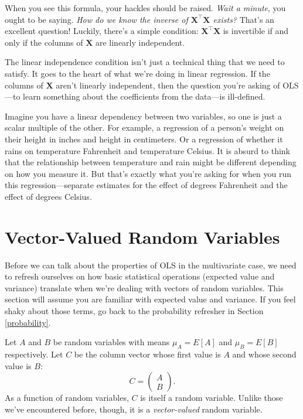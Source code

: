 \documentclass[12pt,oneside,openany]{book}
\begin{document}
When you see this formula, your hackles should be raised. \emph{Wait a
minute}, you ought to be saying. \emph{How do we know the inverse of
\(\mathbf{X}^\top \mathbf{X}\) exists?} That's an excellent question!
Luckily, there's a simple condition: \(\mathbf{X}^\top \mathbf{X}\) is
invertible if and only if the columns of \(\mathbf{X}\) are linearly
independent.

The linear independence condition isn't just a technical thing that we
need to satisfy. It goes to the heart of what we're doing in linear
regression. If the columns of \(\mathbf{X}\) aren't linearly
independent, then the question you're asking of OLS---to learn something
about the coefficients from the data---is ill-defined.

Imagine you have a linear dependency between two variables, so one is
just a scalar multiple of the other. For example, a regression of a
person's weight on their height in inches and height in centimeters. Or
a regression of whether it rains on temperature Fahrenheit and
temperature Celsius. It is absurd to think that the relationship between
temperature and rain might be different depending on how you measure it.
But that's exactly what you're asking for when you run this
regression---separate estimates for the effect of degrees Fahrenheit and
the effect of degrees Celsius.

\section{Vector-Valued Random
Variables}\label{vector-valued-random-variables}

Before we can talk about the properties of OLS in the multivariate case,
we need to refresh ourselves on how basic statistical operations
(expected value and variance) translate when we're dealing with vectors
of random variables. This section will assume you are familiar with
expected value and variance. If you feel shaky about those terms, go
back to the probability refresher in Section \ref{probability}.

Let \(A\) and \(B\) be random variables with means \(\mu_A = E[A]\) and
\(\mu_B = E[B]\) respectively. Let \(C\) be the column vector whose
first value is \(A\) and whose second value is \(B\): \[
C = \begin{pmatrix} A \\ B \end{pmatrix}.
\] As a function of random variables, \(C\) is itself a random variable.
Unlike those we've encountered before, though, it is a
\emph{vector-valued} random variable.
\end{document}
